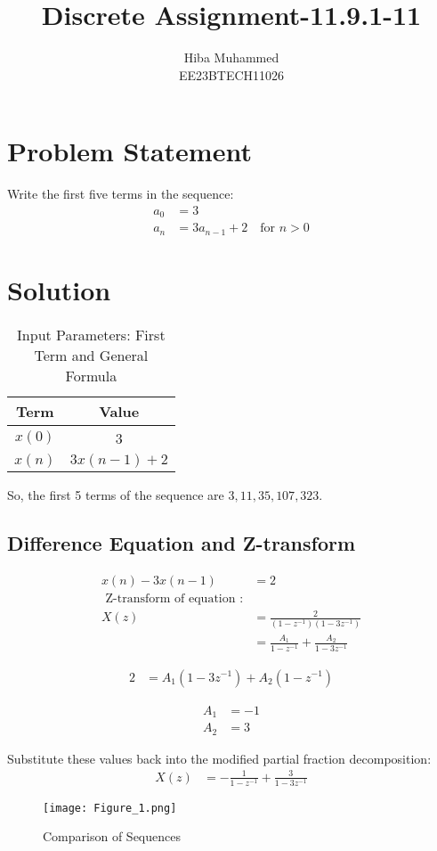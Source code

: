 \documentclass[12pt]{article}
\title{Discrete Assignment-11.9.1-11}
\author{Hiba Muhammed \\
        EE23BTECH11026}
\date{}
\begin{document}
\maketitle

\section*{Problem Statement}
Write the first five terms in the sequence:
\begin{align}
a_{0}  &= 3 \\
a_{n}  &= 3a_{n-1} + 2 \quad \text{for } n > 0
\end{align}

\section*{Solution}
\begin{table}[h]
  \centering
  \caption{Input Parameters: First Term and General Formula}
  \begin{tabular}{|c|c|}
    \hline
    \textbf{Term} & \textbf{Value} \\
    \hline
    \(x(0)\) & 3 \\
    \(x(n)\) & \(3x(n-1) + 2\) \\
    \hline
  \end{tabular}
\end{table}


So, the first 5 terms of the sequence are \(3, 11, 35, 107, 323\).

\subsection*{Difference Equation and Z-transform}

\begin{align}
x(n) - 3x(n-1) &= 2 \\
\text{ Z-transform of equation :} \nonumber \\
X(z) &= \frac{2}{(1 - z^{-1})(1 - 3z^{-1})} \\
&= \frac{A_1}{1 - z^{-1}} + \frac{A_2}{1 - 3z^{-1}}
\end{align}

\begin{align}
2 &= A_1(1-3z^{-1}) + A_2(1-z^{-1})
\end{align}

\begin{align}
A_1 &= -1 \\
A_2 &= 3
\end{align}

Substitute these values back into the modified partial fraction decomposition:
\begin{align*}
X(z) &= -\frac{1}{1-z^{-1}} + \frac{3}{1-3z^{-1}}
\end{align*}


\begin{figure}[h]
    \centering
    \texttt{[image: Figure\_1.png]}
    \caption{Comparison of Sequences}
    \label{fig:comparison}
\end{figure}
\end{document}
